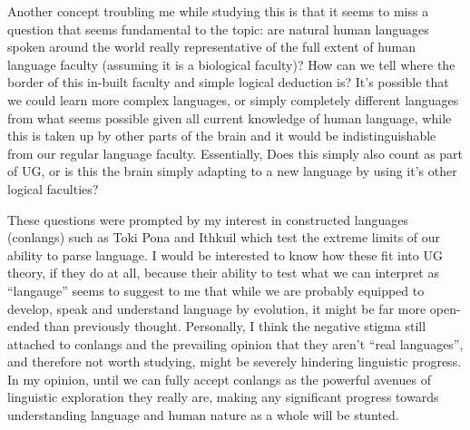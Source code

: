 \documentclass[a4paper,10pt]{article}
\begin{document}
Another concept troubling me while studying this is that it seems to miss a question that seems
fundamental to the topic: are natural human languages spoken around the world really representative
of the full extent of human language faculty (assuming it is a biological faculty)? How can we tell
where the border of this in-built faculty and simple logical deduction is? It's possible
that we could learn more complex languages, or simply completely different languages from what seems
possible given all current knowledge of human language, while this is taken up by other parts of the
brain and it would be indistinguishable from our regular language faculty. Essentially, Does this simply
also count as part of UG, or is this the brain simply adapting to a new language by using it's other
logical faculties?

These questions were prompted by my interest in constructed languages (conlangs) such as
Toki Pona \citep{Lang14} and Ithkuil \citep{Quijada11} which test the extreme limits of our ability to
parse language. I would be interested to know how these fit into UG theory, if they do at all, because
their ability to test what we can interpret as ``langauge'' seems to suggest to me that while we are
probably equipped to develop, speak and understand language by evolution, it might be far more open-ended
than previously thought. Personally, I think the negative stigma still attached to conlangs and the
prevailing opinion that they aren't ``real languages'', and therefore not worth studying, might be
severely hindering linguistic progress. In my opinion, until we can fully accept conlangs as the powerful
avenues of linguistic exploration they really are, making any significant progress towards understanding
language and human nature as a whole will be stunted.


\pagebreak


\end{document}

